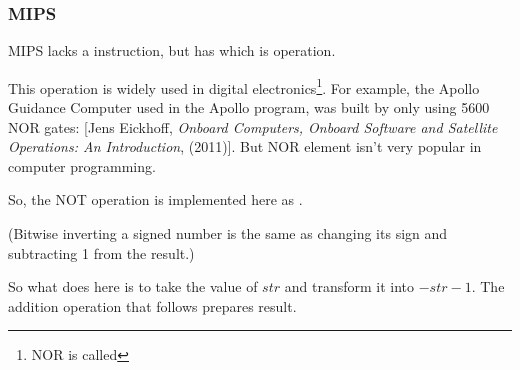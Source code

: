 ﻿\subsubsection{MIPS}




MIPS lacks a \NOT instruction, but has \NOR which is  operation.

This operation is widely used in digital electronics\footnote{NOR is called }.
For example, the Apollo Guidance Computer used in the Apollo program, 
was built by only using 5600 NOR gates:
[Jens Eickhoff, \emph{Onboard Computers, Onboard Software and Satellite Operations: An Introduction}, (2011)].
But NOR element isn't very popular in computer programming.

So, the NOT operation is implemented here as .

(Bitwise inverting a signed number is the same as changing its sign and subtracting 1 from the result.)

So what \NOT does here is to take the value of $str$ and transform it into $-str-1$.
The addition operation that follows prepares result.

